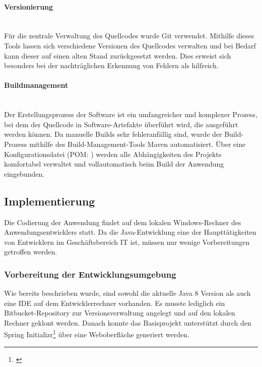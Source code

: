 \paragraph{Versionierung} ~\\
\label{p:Versionierung}
Für die zentrale Verwaltung des Quellcodes wurde Git verwendet. Mithilfe dieses Tools lassen sich verschiedene Versionen des Quellcodes verwalten und bei Bedarf kann dieser auf einen alten Stand zurückgesetzt werden. Dies erweist sich besonders bei der nachträglichen Erkennung von Fehlern als hilfreich.

\paragraph{Buildmanagement} ~\\
\label{p:Buildmangement}
Der Erstellungsprozess der Software ist ein umfangreicher und komplexer Prozess, bei dem der Quellcode in Software-Artefakte überführt wird, die ausgeführt werden können. Da manuelle Builds sehr fehleranfällig sind, wurde der Build-Prozess mithilfe des Build-Management-Tools Maven automatisiert. Über eine Konfigurationsdatei (\acs{POM}: ) werden alle Abhängigkeiten des Projekts komfortabel verwaltet und vollautomatisch beim Build der Anwendung eingebunden.


\subsection{Implementierung} 
\label{sec:Implementierung}
Die Codierung der Anwendung findet auf dem lokalen Windows-Rechner des Anwendungsentwicklers statt. Da die Java-Entwicklung eine der Haupttätigkeiten von Entwicklern im Geschäftsbereich IT ist, müssen nur wenige Vorbereitungen getroffen werden.

\subsubsection{Vorbereitung der Entwicklungsumgebung}
\label{sec:Entwicklungsumgebung}
Wie bereits beschrieben wurde, sind sowohl die aktuelle Java 8 Version als auch eine \ac{IDE} auf dem Entwicklerrechner vorhanden. Es musste lediglich ein Bitbucket-Repository zur Versionsverwaltung angelegt und auf den lokalen Rechner geklont werden. Danach konnte das Basisprojekt unterstützt durch den Spring Initializr\footnote{\cite{spring:init}} über eine Weboberfläche generiert werden.

